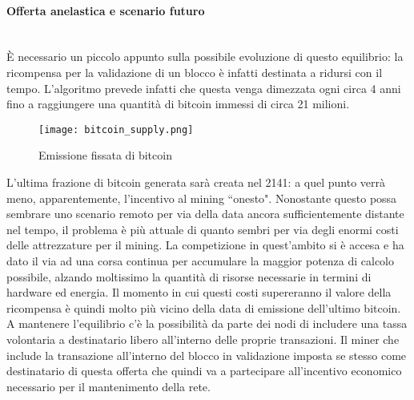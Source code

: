 			\paragraph{Offerta anelastica e scenario futuro} ~ \\
				È necessario un piccolo appunto sulla possibile evoluzione di questo equilibrio: la ricompensa per la validazione di un blocco è infatti destinata a ridursi con il tempo. L'algoritmo prevede infatti che questa venga dimezzata ogni circa 4 anni fino a raggiungere una quantità di bitcoin immessi di circa 21 milioni.
				\begin{figure}[ht]
					\centering
					\texttt{[image: bitcoin\_supply.png]}
					\caption{Emissione fissata di bitcoin}
					\label{fig:bitcoin_supply}
				\end{figure}
				L'ultima frazione di bitcoin generata sarà creata nel 2141: a quel punto verrà meno, apparentemente, l'incentivo al mining ``onesto". Nonostante questo possa sembrare uno scenario remoto per via della data ancora sufficientemente distante nel tempo, il problema è più attuale di quanto sembri per via degli enormi costi delle attrezzature per il mining. La competizione in quest'ambito si è accesa e ha dato il via ad una corsa continua per accumulare la maggior potenza di calcolo possibile, alzando moltissimo la quantità di risorse necessarie in termini di hardware ed energia. Il momento in cui questi costi supereranno il valore della ricompensa è quindi molto più vicino della data di emissione dell'ultimo bitcoin. \\
				A mantenere l'equilibrio c'è la possibilità da parte dei nodi di includere una tassa volontaria a destinatario libero all'interno delle proprie transazioni. Il miner che include la transazione all'interno del blocco in validazione imposta se stesso come destinatario di questa offerta che quindi va a partecipare all'incentivo economico necessario per il mantenimento della rete.